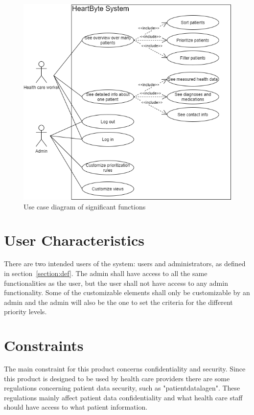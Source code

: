 \documentclass{scrreprt}
\begin{document}
\begin{figure}[htp]
    \centering
    \includegraphics[width=15cm]{useCase.png}
    \caption{Use case diagram of significant functions}
    \label{fig: useCaseDiag}
\end{figure}



\section{User Characteristics}
There are two intended users of the system: users and administrators, as defined in section~\ref{section:def}. The admin shall have access to all the same functionalities as the user, but the user shall not have access to any admin functionality. Some of the customizable elements shall only be customizable by an admin and the admin will also be the one to set the criteria for the different priority levels.


\section{Constraints}
The main constraint for this product concerns confidentiality and security. Since this product is designed to be used by health care providers there are some regulations concerning patient data security, such as "patientdatalagen". These regulations mainly affect patient data confidentiality and what health care staff should have access to what patient information.
\end{document}
